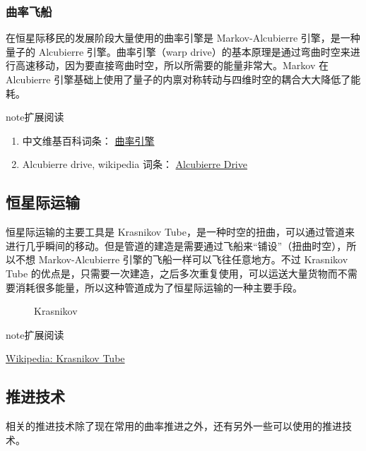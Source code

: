 \documentclass[letterpaper,10pt]{sphinxmanual}
\begin{document}
\subsubsection{曲率飞船}
\label{tech:id14}
在恒星际移民的发展阶段大量使用的曲率引擎是 Markov-Alcubierre 引擎，是一种量子的 Alcubierre 引擎。曲率引擎（warp drive）的基本原理是通过弯曲时空来进行高速移动，因为要直接弯曲时空，所以所需要的能量非常大。Markov 在 Alcubierre 引擎基础上使用了量子的内禀对称转动与四维时空的耦合大大降低了能耗。

\begin{notice}{note}{扩展阅读}
\begin{enumerate}
\item {} 
中文维基百科词条： \href{http://zh.wikipedia.org/wiki/\%E6\%9B\%B2\%E9\%80\%9F\%E5\%BC\%95\%E6\%93\%8E\#.E6.9B.B2.E9.80.9F.E9.80.9F.E5.BA.A6}{曲率引擎}

\item {} 
Alcubierre drive, wikipedia 词条： \href{http://en.wikipedia.org/wiki/Alcubierre\_drive}{Alcubierre Drive}

\end{enumerate}
\end{notice}


\subsection{恒星际运输}
\label{tech:id16}
恒星际运输的主要工具是 Krasnikov Tube，是一种时空的扭曲，可以通过管道来进行几乎瞬间的移动。但是管道的建造是需要通过飞船来“铺设”（扭曲时空），所以不想 Markov-Alcubierre 引擎的飞船一样可以飞往任意地方。不过 Krasnikov Tube 的优点是，只需要一次建造，之后多次重复使用，可以运送大量货物而不需要消耗很多能量，所以这种管道成为了恒星际运输的一种主要手段。
\begin{figure}[htbp]
\centering
\capstart
\caption{Krasnikov}\end{figure}

\begin{notice}{note}{扩展阅读}

\href{https://en.wikipedia.org/wiki/Krasnikov\_tube}{Wikipedia: Krasnikov Tube}
\end{notice}


\subsection{推进技术}
\label{tech:id17}
相关的推进技术除了现在常用的曲率推进之外，还有另外一些可以使用的推进技术。
\end{document}
